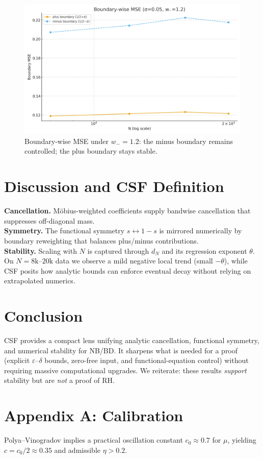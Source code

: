 \documentclass[11pt]{article}
\theoremstyle{remark}
\begin{document}
\begin{figure}[h]
\centering
\includegraphics[width=0.75\linewidth]{figures/boundary_reweighting.png}
\caption{Boundary-wise MSE under $w_-=1.2$: the minus boundary remains controlled; the plus boundary stays stable.}
\label{fig:boundary}
\end{figure}

\section{Discussion and CSF Definition}
\textbf{Cancellation.} M\"obius-weighted coefficients supply bandwise cancellation that suppresses off-diagonal mass.\\
\textbf{Symmetry.} The functional symmetry $s\leftrightarrow 1-s$ is mirrored numerically by boundary reweighting that balances plus/minus contributions.\\
\textbf{Stability.} Scaling with $N$ is captured through $d_N$ and its regression exponent $\theta$. On $N=8\mathrm{k}\text{--}20\mathrm{k}$ data we observe a mild negative local trend (small $-\theta$), while CSF posits how analytic bounds can enforce eventual decay without relying on extrapolated numerics.

\section{Conclusion}
CSF provides a compact lens unifying analytic cancellation, functional symmetry, and numerical stability for NB/BD.
It sharpens what is needed for a proof (explicit $\varepsilon$--$\delta$ bounds, zero-free input, and functional-equation control) without requiring massive computational upgrades.
We reiterate: these results \emph{support} stability but are \emph{not} a proof of RH.

\appendix
\section{Appendix A: Calibration}
Polya--Vinogradov implies a practical oscillation constant $c_0\approx 0.7$ for $\mu$, yielding $c=c_0/2\approx 0.35$ and admissible $\eta>0.2$.
\end{document}
